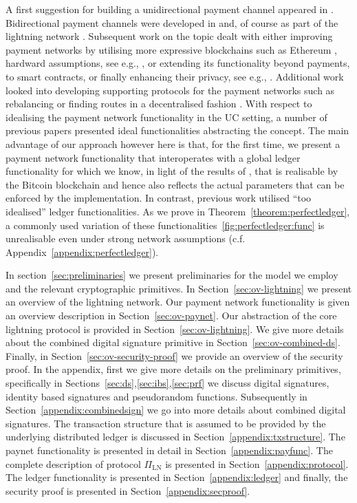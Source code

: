  A first suggestion for building a unidirectional
payment channel appeared in \cite{spilman}. Bidirectional payment channels were
developed in \cite{DBLP:conf/sss/DeckerW15} and, of course as part of the
lightning network \cite{lightning}. Subsequent work on the topic dealt with
either improving payment networks by utilising more expressive blockchains such
as Ethereum \cite{perun}, hardward assumptions, see e.g.,
\cite{DBLP:conf/systor/LindNEKPS18}, or extending its functionality beyond
payments, to smart contracts, \cite{sprites} or finally enhancing their privacy,
see e.g.,
\cite{Malavolta:2017:CPP:3133956.3134096,DBLP:conf/ccs/0001M17,DBLP:conf/ndss/HeilmanABSG17}.
Additional work looked into developing supporting protocols for the payment
networks such as rebalancing \cite{DBLP:conf/ccs/KhalilG17} or finding routes in
a decentralised fashion \cite{flare,spider}. With respect to idealising the
payment network functionality in the UC setting, a number of previous papers
\cite{DBLP:conf/ccs/DziembowskiFH18,Malavolta:2017:CPP:3133956.3134096,sprites,perun}
presented ideal functionalities abstracting the concept. The main advantage of
our approach however here is that, for the first time, we present a payment
network functionality that interoperates with a global ledger functionality for
which we know, in light of the results of \cite{BMTZ17}, that is realisable by
the Bitcoin blockchain and hence also reflects the actual parameters that can be
enforced by the implementation. In contrast, previous work utilised ``too
idealised'' ledger functionalities. As we prove in
Theorem~\ref{theorem:perfectledger}, a commonly used variation of these
functionalities~\ref{fig:perfectledger:func} is unrealisable even under strong
network assumptions (c.f. Appendix~\ref{appendix:perfectledger}).

 In section~\ref{sec:preliminaries} we present
preliminaries for the model we employ and the relevant cryptographic primitives.
In Section~\ref{sec:ov-lightning} we present an overview of the lightning
network. Our payment network functionality is given an overview description in
Section~\ref{sec:ov-paynet}. Our abstraction of the core lightning protocol is
provided in Section~\ref{sec:ov-lightning}. We give more details about the
combined digital signature primitive in Section~\ref{sec:ov-combined-ds}.
Finally, in Section~\ref{sec:ov-security-proof} we provide an overview of the
security proof. In the appendix, first we give more details on the preliminary
primitives, specifically in Sections~\ref{sec:ds},\ref{sec:ibs},\ref{sec:prf} we
discuss digital signatures, identity based signatures and pseudorandom
functions. Subsequently in Section~\ref{appendix:combinedsign} we go into more
details about combined digital signatures. The transaction structure that is
assumed to be provided by the underlying distributed ledger is discussed in
Section~\ref{appendix:txstructure}. The paynet functionality is presented in
detail in Section~\ref{appendix:payfunc}. The complete description of protocol
$\Pi_{\mathrm{LN}}$ is presented in Section~\ref{appendix:protocol}. The ledger
functionality is presented in Section~\ref{appendix:ledger} and finally, the
security proof is presented in Section~\ref{appendix:secproof}.
